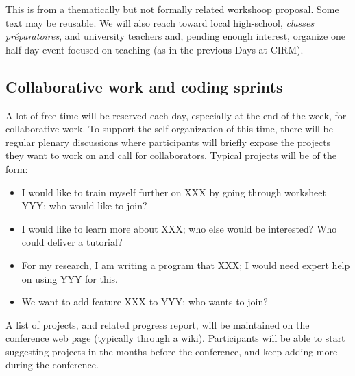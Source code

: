 \begin{oldpart}{This is from a thematically but not formally related workshoop proposal. Some text may be reusable.}
We will also reach toward local high-school, \textit{classes préparatoires},
and university teachers and, pending enough interest, organize one
half-day event focused on teaching (as in the previous \Sage Days at
CIRM).

\subsection{Collaborative work and coding sprints}

A lot of free time will be reserved each day, especially at the end of
the week, for collaborative work. To support the self-organization of
this time, there will be regular plenary discussions where
participants will briefly expose the projects they want to work on and
call for collaborators. Typical projects will be of the form:
\begin{itemize}
\item I would like to train myself further on XXX by going through
  worksheet YYY; who would like to join?
\item I would like to learn more about XXX; who else would be
  interested? Who could deliver a tutorial?
\item For my research, I am writing a program that XXX; I would need
  expert help on using YYY for this.
\item We want to add feature XXX to YYY; who wants to join?
\end{itemize}

A list of projects, and related progress report, will be maintained on
the conference web page (typically through a wiki). Participants will
be able to start suggesting projects in the months before the conference,
and keep adding more during the conference.
\end{oldpart}

